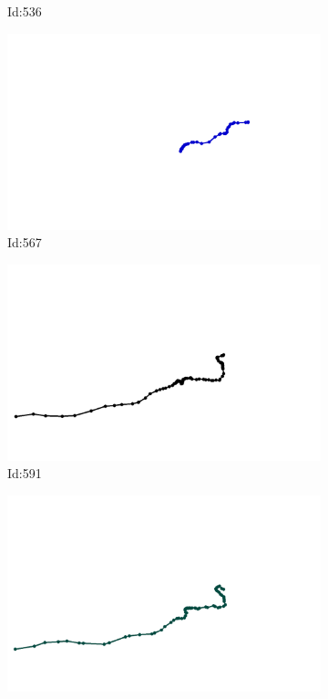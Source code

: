 \documentclass[12pt,twoside]{report}
\begin{document}
\begin{figure}
\begin{subfigure}[b]{0.20\textwidth}
\caption{Id:536}
\end{subfigure}
\begin{subfigure}[b]{0.20\textwidth}
\centering
\includegraphics[width=\textwidth]{../trajectories/567.png}
\caption{Id:567}
\end{subfigure}
\begin{subfigure}[b]{0.20\textwidth}
\centering
\includegraphics[width=\textwidth]{../trajectories/591.png}
\caption{Id:591}
\end{subfigure}
\begin{subfigure}[b]{0.20\textwidth}
\centering
\includegraphics[width=\textwidth]{../trajectories/594.png}

\end{subfigure}
\end{figure}
\end{document}
